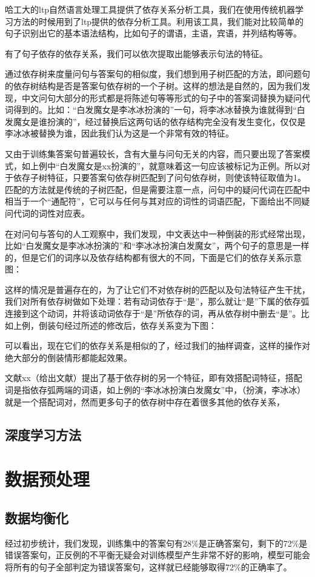 \documentclass[UTF8]{ctexart}
\begin{document}
哈工大的ltp自然语言处理工具提供了依存关系分析工具，我们在使用传统机器学习方法的时候用到了ltp提供的依存分析工具。利用该工具，我们能对比较简单的句子识别出它的基本语法结构，比如句子的谓语，主语，宾语，并列结构等等。

有了句子依存的依存关系，我们可以依次提取出能够表示句法的特征。

通过依存树来度量问句与答案句的相似度，我们想到用子树匹配的方法，即问题句的依存树结构是否是答案句依存树的一个子树。这样的想法是自然的，因为我们发现，中文问句大部分的形式都是将陈述句等等形式的句子中的答案词替换为疑问代词得到的。比如：“白发魔女是李冰冰扮演的”一句，将李冰冰替换为谁就得到“白发魔女是谁扮演的”，经过替换后这两句话的依存结构完全没有发生变化，仅仅是李冰冰被替换为谁，因此我们认为这是一个非常有效的特征。

又由于训练集答案句普遍较长，含有大量与问句无关的内容，而只要出现了答案模式，如上例中“白发魔女是xx扮演的”，就意味着这一句应该被标记为正例。所以对于依存子树特征，只要答案句依存树匹配到了问句依存树，则使该特征取值为1。匹配的方法就是传统的子树匹配，但是需要注意一点，问句中的疑问代词在匹配中相当于一个“通配符”，它可以与任何与其对应的词性的词语匹配，下面给出不同疑问代词的词性对应表。%

在对问句与答句的人工观察中，我们发现，中文表达中一种倒装的形式经常出现，比如“白发魔女是李冰冰扮演的”和“李冰冰扮演白发魔女”，两个句子的意思是一样的，但是它们的词序以及依存结构都有很大的不同，下面是它们的依存关系示意图：%

这样的情况是普遍存在的，为了让它们不对依存树的匹配以及句法特征产生干扰，我们对所有依存树做如下处理：若有动词依存于“是”，那么就让“是”下属的依存弧连接到这个动词，并将该动词依存于“是”所依存的词，再从依存树中删去“是”。比如上例，倒装句经过所述的修改后，依存关系变为下图：%

可以看出，现在它们的依存关系是相似的了，经过我们的抽样调查，这样的操作对绝大部分的倒装情形都能起效果。

文献xx（给出文献）提出了基于依存树的另一个特征，即有效搭配词特征，搭配词是指依存弧两端的词语，如上例的“李冰冰扮演白发魔女”中，（扮演，李冰冰）就是一个搭配词对，然而更多句子的依存树中存在着很多其他的依存关系，
\subsection{深度学习方法}

\section{数据预处理}
\subsection{数据均衡化}
经过初步统计，我们发现，训练集中的答案句有28\%是正确答案句，剩下的72\%是错误答案句，正反例的不平衡无疑会对训练模型产生非常不好的影响，模型可能会将所有的句子全部判定为错误答案句，这样就已经能够取得72\%的正确率了。
\end{document}
